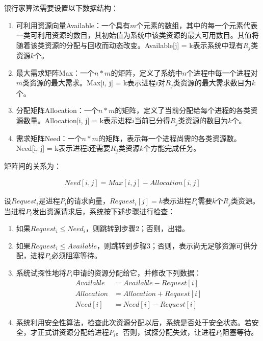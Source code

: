 银行家算法需要设置以下数据结构：

\begin{enumerate}
    \item 可利用资源向量Available：一个具有$ m $个元素的数组，其中的每一个元素代表一类可利用资源的数目，其初始值为系统中该类资源的最大可用数目。其值将随着该类资源的分配与回收而动态改变。Available[j] = k表示系统中现有$ R_j $类资源$ k $个。

    \item 最大需求矩阵Max：一个$ n * m $的矩阵，定义了系统中$ n $个进程中每一个进程对$ m $类资源的最大需求。Max[i, j] = k表示进程$ i $对$ R_j $类资源的最大需求数目为$ k $个。

    \item 分配矩阵Allocation：一个$ n * m $的矩阵，定义了当前分配给每个进程的各类资源数量。Allocation[i, j] = k表示进程$ i $当前已分得$ R_j $类资源的数目为$ k $个。

    \item 需求矩阵Need：一个$ n * m $的矩阵，表示每一个进程尚需的各类资源数。Need[i, j] = k表示进程i还需要$ R_j $类资源$ k $个方能完成任务。
\end{enumerate}

矩阵间的关系为：

\vspace{-1cm}
\begin{align}\nonumber
    Need[i, j] = Max[i, j] - Allocation[i, j]
\end{align}

设$ Request_i $是进程$ P_i $的请求向量，$ Request_i[j] = k $表示进程$ P_i $需要$ k $个$ R_j $类资源。当进程$ P_i $发出资源请求后，系统按下述步骤进行检查：

\begin{enumerate}
    \item 如果$ Request_i \le Need_i $，则跳转到步骤2；否则，出错。

    \item 如果$ Request_i \le Available $，则跳转到步骤3；否则，表示尚无足够资源可供分配，进程$ P_i $必须阻塞等待。

    \item 系统试探性地将$ P_i $申请的资源分配给它，并修改下列数据：
          \begin{align}\nonumber
              Available  & = Available - Request[i]  \\ \nonumber
              Allocation & = Allocation + Request[i] \\ \nonumber
              Need[i]    & = Need[i] - Request[i]
          \end{align}

    \item 系统利用安全性算法，检查此次资源分配以后，系统是否处于安全状态。若安全，才正式讲资源分配给进程$ P_i $。否则，试探分配失效，让进程$ P_i $阻塞等待。
\end{enumerate}

